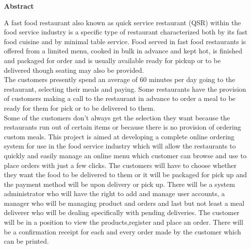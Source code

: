 \documentclass[english]{article}
\begin{document}



\textbf{\Large Abstract}
\vspace{20pt}

%

A fast food restaurant also known as quick service restaurant (QSR) within the food service industry is a specific type of restaurant characterized both by its fast food cuisine
and by minimal table service. Food served in fast food restaurants is offered from a limited
menu, cooked in bulk in advance and kept hot, is finished and packaged for order and is
usually available ready for pickup or to be delivered though seating may also be provided.\\

The customers presently spend an average of 60 minutes per day going to the restaurant,
selecting their meals and paying. Some restaurants have the provision of customers making
a call to the restaurant in advance to order a meal to be ready for them for pick or to be
delivered to them.\\

Some of the customers don’t always get the selection they want because the restaurants run out of certain items or because there is no provision of ordering custom meals. This project
is aimed at developing a complete online ordering system for use in the food service industry
which will allow the restaurants to quickly and easily manage an online menu which customer
can browse and use to place orders with just a few clicks. The customers will have to choose
whether they want the food to be delivered to them or it will be packaged for pick up and
the payment method will be upon delivery or pick up. There will be a system administrator
who will have the right to add and manage user accounts, a manager who will be managing
product and orders and last but not least a meal deliverer who will be dealing specifically
with pending deliveries. The customer will be in a position to view the products,register
and place an order. There will be a confirmation receipt for each and every order made by
the customer which can be printed.\\
\end{document}
